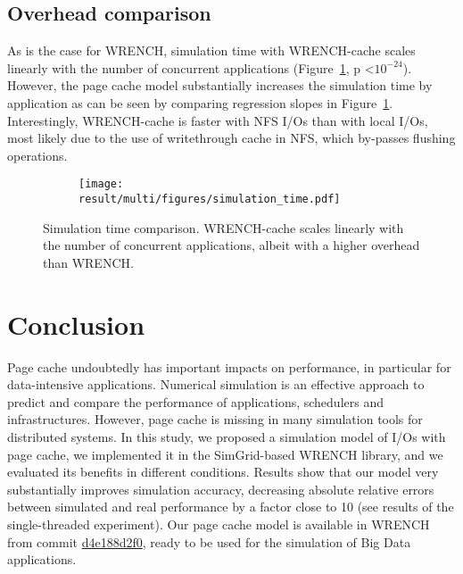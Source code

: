 \documentclass[conference]{IEEEtran}
\newcommand{\tristan}[1]{\color{orange}\textbf{From Tristan:}#1\color{black}}
\newcommand{\simgrid}{SimGrid\xspace}
\newcommand{\wrench}{WRENCH\xspace}
\begin{document}
        \subsection{Overhead comparison}
        As is the case for \wrench, simulation time with \wrench-cache scales
        linearly with the number of concurrent applications
        (Figure~\ref{fig:multi_time}, p \textless $10^{-24}$). However, the page
        cache model substantially increases the simulation time by
        application as can be seen by comparing regression slopes in
        Figure~\ref{fig:multi_time}. Interestingly, \wrench-cache is faster with 
        NFS I/Os than with local I/Os, most likely due to the use of writethrough
        cache in NFS, which by-passes flushing operations.
        \begin{figure}
            \begin{subfigure}{\columnwidth}
                \centering
                \texttt{[image: result/multi/figures/simulation\_time.pdf]}
            \end{subfigure}
            \caption{Simulation time comparison. \wrench-cache scales
            linearly with the number of concurrent applications, albeit
            with a higher overhead than \wrench.}
            \label{fig:multi_time}
            \end{figure}


    \section{Conclusion}
    \label{discussion}
        Page cache undoubtedly has important impacts on performance, in
        particular for data-intensive applications. Numerical simulation is
        an effective approach to predict and compare the performance of
        applications, schedulers and infrastructures. However, page cache
        is missing in many simulation tools for distributed systems. In
        this study, we proposed a simulation model of I/Os with page cache,
        we implemented it in the \simgrid-based \wrench library, and we
        evaluated its benefits in different conditions. Results show that
        our model very substantially improves simulation accuracy,
        decreasing absolute relative errors between simulated and real
        performance by a factor close to 10 (see results of the
        single-threaded experiment). 
        Our page cache model is available
        in \wrench from commit \href{https://github.com/wrench-project/wrench/tree/d4e188d2f0cf69a19ae0a6b5e41530eb77d12cd8}{d4e188d2f0}, ready to be used 
        for the simulation of Big Data applications.
\end{document}
